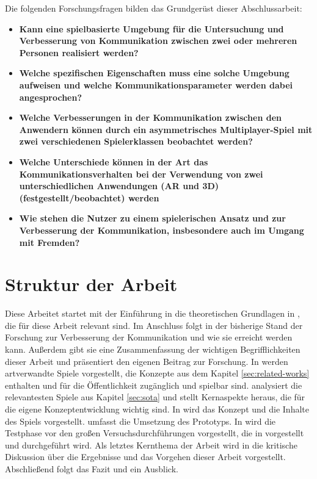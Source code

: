 Die folgenden Forschungsfragen bilden das Grundgerüst dieser Abschlussarbeit:


\begin{itemize}
    \item \textbf{Kann eine spielbasierte Umgebung für die Untersuchung und Verbesserung von Kommunikation zwischen zwei oder mehreren Personen realisiert werden?}
    \item \textbf{Welche spezifischen Eigenschaften muss eine solche Umgebung aufweisen und welche Kommunikationsparameter werden dabei angesprochen?}
    \item \textbf{Welche Verbesserungen in der Kommunikation zwischen den Anwendern können durch ein asymmetrisches Multiplayer-Spiel mit zwei verschiedenen Spielerklassen beobachtet werden?}
    \item \textbf{Welche Unterschiede können in der Art das Kommunikationsverhalten bei der Verwendung von zwei unterschiedlichen Anwendungen (AR und 3D) (festgestellt/beobachtet) werden}
    \item \textbf{Wie stehen die Nutzer zu einem spielerischen Ansatz und zur Verbesserung der Kommunikation, insbesondere auch im Umgang mit Fremden?}
\end{itemize}

\section{Struktur der Arbeit}
Diese Arbeitet startet mit der Einführung in die theoretischen Grundlagen in , die für diese Arbeit relevant sind. Im Anschluss folgt in  der bisherige Stand der Forschung zur Verbesserung der Kommunikation und wie sie erreicht werden kann. Außerdem gibt sie eine Zusammenfassung der wichtigen Begrifflichkeiten dieser Arbeit und präsentiert den eigenen Beitrag zur Forschung. In  werden artverwandte Spiele vorgestellt, die Konzepte aus dem Kapitel \ref{sec:related-works} enthalten und für die Öffentlichkeit zugänglich und spielbar sind.  analysiert die relevantesten Spiele aus Kapitel \ref{sec:sota} und stellt Kernaspekte heraus, die für die eigene Konzeptentwicklung wichtig sind. In  wird das Konzept und die Inhalte des Spiels vorgestellt.  umfasst die Umsetzung des Prototyps. In  wird die Testphase vor den großen Versuchsdurchführungen vorgestellt, die in  vorgestellt und durchgeführt wird. Als letztes Kernthema der Arbeit wird in  die kritische Diskussion über die Ergebnisse und das Vorgehen dieser Arbeit vorgestellt. Abschließend folgt das Fazit und ein Ausblick.
